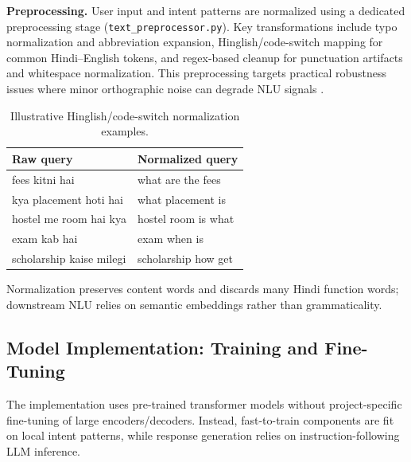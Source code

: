 \documentclass[12pt,onecolumn]{report}
\begin{document}
\textbf{Preprocessing.} User input and intent patterns are normalized using a dedicated preprocessing stage (\texttt{text\_preprocessor.py}). Key transformations include typo normalization and abbreviation expansion, Hinglish/code-switch mapping for common Hindi--English tokens, and regex-based cleanup for punctuation artifacts and whitespace normalization. This preprocessing targets practical robustness issues where minor orthographic noise can degrade NLU signals \cite{belinkov2018synthetic,sun2020adversarial}.

\begin{table}[t]
\caption{Illustrative Hinglish/code-switch normalization examples.}
\label{tab:hinglish-examples}
\centering
\small
\renewcommand{\arraystretch}{1.25}
\setlength{\tabcolsep}{6pt}
\begin{tabular}{p{}p{}}
\toprule
\textbf{Raw query} & \textbf{Normalized query}\\
\midrule
fees kitni hai & what are the fees\\
kya placement hoti hai & what placement is\\
hostel me room hai kya & hostel room is what\\
exam kab hai & exam when is\\
scholarship kaise milegi & scholarship how get\\
\bottomrule
\end{tabular}
\end{table}
Normalization preserves content words and discards many Hindi function words; downstream NLU relies on semantic embeddings rather than grammaticality.

\subsection{Model Implementation: Training and Fine-Tuning}
The implementation uses pre-trained transformer models without project-specific fine-tuning of large encoders/decoders. Instead, fast-to-train components are fit on local intent patterns, while response generation relies on instruction-following LLM inference.
\end{document}
